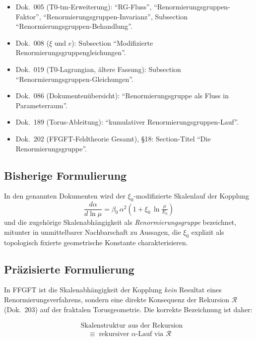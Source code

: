 \begin{itemize}
  \item Dok.~005 (T0-tm-Erweiterung): \enquote{RG-Fluss}, \enquote{Renormierungs\-gruppen-Faktor},
        \enquote{Renormierungs\-gruppen-Invarianz},
        Subsection \enquote{Renormierungs\-gruppen-Behandlung}.
  \item Dok.~008 ($\xi$ und $e$): Subsection \enquote{Modifizierte
        Renormierungs\-gruppen\-gleichungen}.
  \item Dok.~019 (T0-Lagrangian, ältere Fassung):
        Subsection \enquote{Renormierungs\-gruppen-Gleichungen}.
  \item Dok.~086 (Dokumentenübersicht): \enquote{Renormierungsgruppe als Fluss
        in Parameterraum}.
  \item Dok.~189 (Torus-Ableitung): \enquote{kumulativer
        Renormierungs\-gruppen-Lauf}.
  \item Dok.~202 (FFGFT-Feldtheorie Gesamt), \S 18:
        Section-Titel \enquote{Die Renormierungsgruppe}.
\end{itemize}

\subsection*{Bisherige Formulierung}

In den genannten Dokumenten wird der $\xi_0$-modifizierte Skalenlauf
der Kopplung
\begin{equation}
  \frac{d\alpha}{d\ln\mu}
  = \beta_0\,\alpha^2\!\left(1 + \xi_0\,\ln\tfrac{\mu}{E_0}\right)
  \tag{alt -- ungenau}
\end{equation}
und die zugehörige Skalenabhängigkeit als \emph{Renormierungsgruppe}
bezeichnet, mitunter in unmittelbarer Nachbarschaft zu Aussagen, die
$\xi_0$ explizit als topologisch fixierte geometrische Konstante
charakterisieren.

\subsection*{Präzisierte Formulierung}

In FFGFT ist die Skalenabhängigkeit der Kopplung \emph{kein} Resultat
eines Renormierungsverfahrens, sondern eine direkte Konsequenz der
Rekursion $\mathcal{R}$ (Dok.~203) auf der fraktalen Torusgeometrie.
Die korrekte Bezeichnung ist daher:

\begin{equation}
  \boxed{\;
  \begin{aligned}
    &\text{Skalenstruktur aus der Rekursion} \\
    &\quad\equiv\; \text{rekursiver $\alpha$-Lauf via $\mathcal{R}$}
  \end{aligned}
  \;}
  \tag{190.12}
\end{equation}


